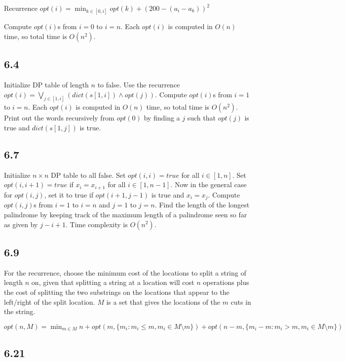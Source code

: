 \documentclass[11pt]{article}
\begin{document}
Recurrence $opt(i) = \min_{k \in [0, i]} opt(k) + (200 - (a_i - a_k))^2$

Compute $opt(i)$s from $i = 0$ to $i = n$. Each $opt(i)$ is computed in $O(n)$ time, so total time is $O(n^2)$.

\subsection{6.4}

Initialize DP table of length $n$ to false. Use the recurrence $opt(i) = \bigvee_{j \in [1, i]} (dict(s[1, i]) \wedge opt(j))$. Compute $opt(i)$s from $i = 1$ to $i = n$. Each $opt(i)$ is computed in $O(n)$ time, so total time is $O(n^2)$. Print out the words recursively from $opt(0)$ by finding a $j$ such that $opt(j)$ is true and $dict(s[1, j])$ is true.

\subsection{6.7}

Initialize $n \times n$ DP table to all false. Set $opt(i, i) = true$ for all $i \in [1, n]$. Set $opt(i, i + 1) = true$ if $x_i = x_{i+1}$ for all $i \in [1, n-1]$. Now in the general case for $opt(i, j)$, set it to true if $opt(i + 1, j - 1)$ is true and $x_i = x_j$. Compute $opt(i, j)$s from $i = 1$ to $i = n$ and $j = 1$ to $j = n$. Find the length of the longest palindrome by keeping track of the maximum length of a palindrome seen so far as given by $j - i + 1$. Time complexity is $O(n^2)$.

\subsection{6.9}

For the recurrence, choose the minimum cost of the locations to split a string of length $n$ on, given that splitting a string at a location will cost $n$ operations plus the cost of splitting the two substrings on the locations that appear to the left/right of the split location. $M$ is a set that gives the locations of the $m$ cuts in the string.

$opt(n, M) = \min_{m \in M} n + opt(m, \{ m_i : m_i \leq m, m_i \in M \setminus m \}) + opt(n - m, \{ m_i - m : m_i > m, m_i \in M \setminus m \})$

\subsection{6.21}
\end{document}
